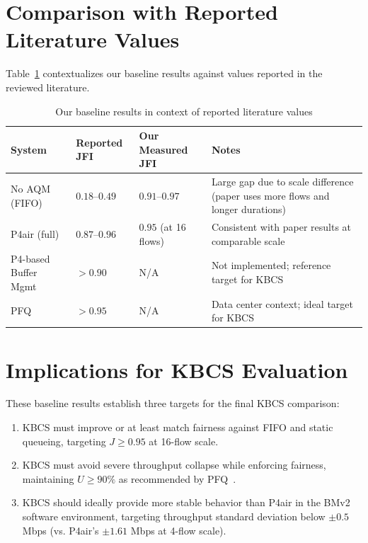 \documentclass[12pt,a4paper]{report}
\begin{document}
\section{Comparison with Reported Literature Values}
Table~\ref{tab:literature_comparison} contextualizes our baseline results against values reported in the reviewed literature.

\begin{table}[H]
\centering
\caption{Our baseline results in context of reported literature values}
\label{tab:literature_comparison}
\renewcommand{\arraystretch}{1.3}
\begin{tabularx}{\textwidth}{@{}p{3.6cm}p{2.2cm}p{2.8cm}X@{}}
\toprule
\textbf{System} & \textbf{Reported JFI} & \textbf{Our Measured JFI} & \textbf{Notes} \\
\midrule
No AQM (FIFO) & $0.18$--$0.49$~\cite{p4air} & $0.91$--$0.97$ & Large gap due to scale difference (paper uses more flows and longer durations) \\
P4air (full) & $0.87$--$0.96$~\cite{p4air} & $0.95$ (at 16 flows) & Consistent with paper results at comparable scale \\
P4-based Buffer Mgmt & $>0.90$~\cite{buffermgmt} & N/A & Not implemented; reference target for KBCS \\
PFQ & $>0.95$~\cite{pfq} & N/A & Data center context; ideal target for KBCS \\
\bottomrule
\end{tabularx}
\end{table}

\section{Implications for KBCS Evaluation}
These baseline results establish three targets for the final KBCS comparison:
\begin{enumerate}
    \item KBCS must improve or at least match fairness against FIFO and static queueing, targeting $J \geq 0.95$ at 16-flow scale.
    \item KBCS must avoid severe throughput collapse while enforcing fairness, maintaining $U \geq 90\%$ as recommended by PFQ~\cite{pfq}.
    \item KBCS should ideally provide more stable behavior than P4air in the BMv2 software environment, targeting throughput standard deviation below $\pm 0.5$ Mbps (vs. P4air's $\pm 1.61$ Mbps at 4-flow scale).
\end{enumerate}
\end{document}
